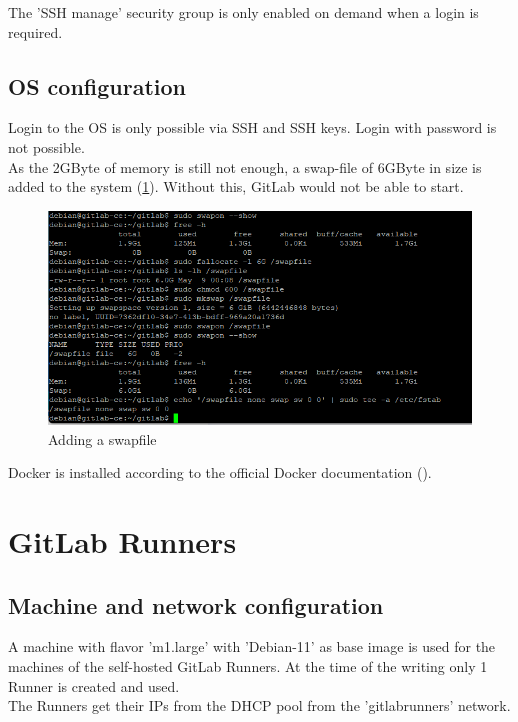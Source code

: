 The 'SSH manage' security group is only enabled on demand when a login is required.

\subsection{OS configuration}

Login to the OS is only possible via SSH and SSH keys. Login with password is not possible.\\

As the 2GByte of memory is still not enough, a swap-file of 6GByte in size is added to the system (\ref{fig:swapfile}).
Without this, GitLab would not be able to start.

\begin{figure}[H]
	\centering
	\includegraphics[width=14cm]{images/swapfile.png}
	\caption{Adding a swapfile}
	\label{fig:swapfile}
\end{figure}

Docker is installed according to the official Docker documentation (\cite{refDockerDebian}).

\section{GitLab Runners}

\subsection{Machine and network configuration}

A machine with flavor 'm1.large' with 'Debian-11' as base image is used for the machines of the self-hosted GitLab Runners.
At the time of the writing only 1 Runner is created and used.\\

The Runners get their IPs from the DHCP pool from the 'gitlabrunners' network.\\

